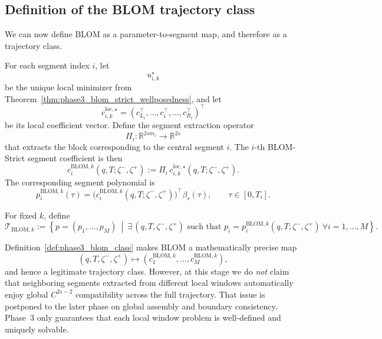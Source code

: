 \subsection{Definition of the BLOM trajectory class}
\label{subsec:phase3_blom_trajectory_class}

We can now define BLOM as a parameter-to-segment map, and therefore as a trajectory class.

For each segment index \(i\), let
\[
u_{i,k}^\star
\]
be the unique local minimizer from Theorem~\ref{thm:phase3_blom_strict_wellposedness}, and let
\[
c_{i,k}^{\mathrm{loc},\star}
=
(c_{L_i}^\top,\dots,c_i^\top,\dots,c_{R_i}^\top)^\top
\]
be its local coefficient vector.
Define the segment extraction operator
\[
\Pi_i:\mathbb R^{2s m_i}\to\mathbb R^{2s}
\]
that extracts the block corresponding to the central segment \(i\).
The \(i\)-th BLOM-Strict segment coefficient is then
\begin{equation}
\label{eq:phase3_blom_segment_coeff}
c_i^{\mathrm{BLOM},k}(q,T;\zeta^-,\zeta^+)
:=
\Pi_i\, c_{i,k}^{\mathrm{loc},\star}(q,T;\zeta^-,\zeta^+).
\end{equation}
The corresponding segment polynomial is
\begin{equation}
\label{eq:phase3_blom_segment_poly}
p_i^{\mathrm{BLOM},k}(\tau)
=
\bigl(c_i^{\mathrm{BLOM},k}(q,T;\zeta^-,\zeta^+)\bigr)^\top \beta_s(\tau),
\qquad
\tau\in[0,T_i].
\end{equation}

\begin{definition}
\label{def:phase3_blom_class}
For fixed \(k\), define
\begin{equation}
\label{eq:phase3_blom_class}
\mathcal T_{\mathrm{BLOM},k}
:=
\left\{
p=(p_1,\dots,p_M)
\ \middle|\
\exists\,(q,T,\zeta^-,\zeta^+)
\text{ such that }
p_i=p_i^{\mathrm{BLOM},k}(q,T;\zeta^-,\zeta^+)
\ \forall i=1,\dots,M
\right\}.
\end{equation}
\end{definition}

\begin{remark}[What \(\mathcal T_{\mathrm{BLOM},k}\) means at this stage]
\label{rem:phase3_blom_class_scope}
Definition~\ref{def:phase3_blom_class} makes BLOM a mathematically precise map
\[
(q,T,\zeta^-,\zeta^+)\longmapsto (c_1^{\mathrm{BLOM},k},\dots,c_M^{\mathrm{BLOM},k}),
\]
and hence a legitimate trajectory class.
However, at this stage we do \emph{not} claim that neighboring segments extracted from different local windows automatically enjoy global \(C^{2s-2}\) compatibility across the full trajectory.
That issue is postponed to the later phase on global assembly and boundary consistency.
Phase~3 only guarantees that each local window problem is well-defined and uniquely solvable.
\end{remark}

